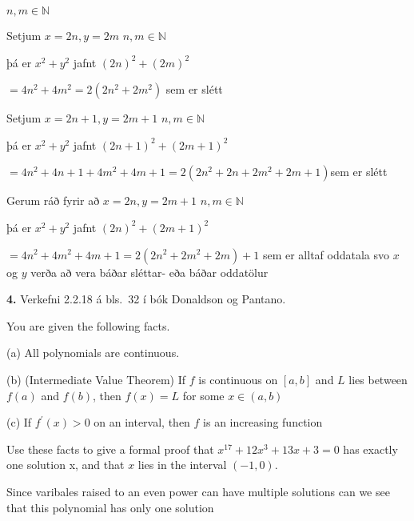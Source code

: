 \documentclass[12pt]{article}
\begin{document}


$n,m\in \mathbb{N} $




Setjum $x=2n, y=2m$   $n,m\in \mathbb{N}$

þá er $x^2 + y^2$ jafnt $(2n)^2 + (2m)^2$

$= 4n^2+4m^2 = 2(2n^2 +2m^2)$ sem er slétt 

Setjum $x=2n+1, y=2m+1$   $n,m\in \mathbb{N}$

þá er $x^2 + y^2$ jafnt $(2n+1)^2 + (2m+1)^2$

$= 4n^2+4n+1+4m^2+4m+1 = 2(2n^2+2n+2m^2+2m+1)$sem er slétt

Gerum ráð fyrir að $x = 2n, y = 2m+1$   $n,m\in \mathbb{N} $ 

þá er $x^2 + y^2$ jafnt $(2n)^2 + (2m+1)^2$

$= 4n^2+4m^2 +4m +1 = 2(2n^2 +2m^2 +2m)+1$ sem er alltaf oddatala svo $x$ og $y$ verða að vera báðar sléttar- eða báðar oddatölur


\smallskip
\bigskip
\bigskip

{\bf 4.}  Verkefni 2.2.18 á bls.~32 í bók Donaldson og Pantano.

You are given the following facts.

(a) All polynomials are continuous.

(b) (Intermediate Value Theorem) If $f$ is continuous on $[a,b]$ and $L$ lies between $f(a)$ and $f(b)$, then $f(x)=L$ for some $x\in (a,b)$

(c) If $f^' (x)>0$ on an interval, then $f$ is an increasing function

Use these facts to give a formal proof that $x^17 + 12x^3 + 13x + 3 = 0$ has exactly one solution x, and that $x$ lies in the interval $(-1, 0)$.

Since varibales raised to an even power can have multiple solutions can we see that this polynomial has only one solution
\end{document}
